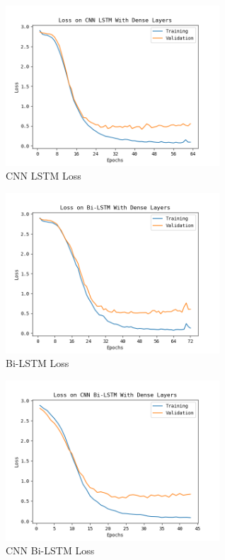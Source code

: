 \documentclass[journal]{IEEEtran}
\begin{document}
    \begin{figure}[h]
      \centering
      \includegraphics[width=8cm]{figures/02-07-24ForwardCNN LSTM With Dense Layers_loss.png}
      \caption{CNN LSTM Loss}
      \label{fig:cnn_loss}
    \end{figure}

    \begin{figure}[h]
      \centering
      \includegraphics[width=8cm]{figures/02-31-57Forward_Bi-LSTM With Dense Layers_loss.png}
      \caption{Bi-LSTM Loss}
      \label{fig:bilstm_loss}
    \end{figure}

    \begin{figure}[h]
      \centering
      \includegraphics[width=8cm]{figures/02-34-46Forward_CNN Bi-LSTM With Dense Layers_loss.png}
      \caption{CNN Bi-LSTM Loss}
      \label{fig:cnn_bilstm_loss}
    \end{figure}
\end{document}
